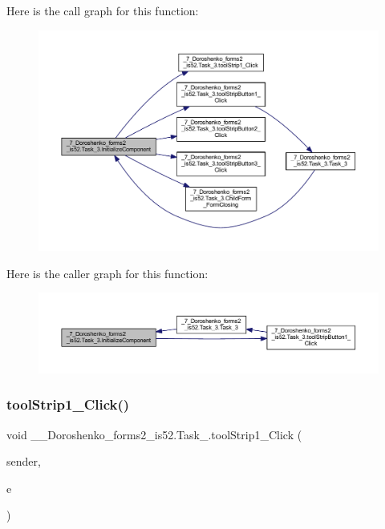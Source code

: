 Here is the call graph for this function\+:
\nopagebreak
\begin{figure}[H]
\begin{center}
\leavevmode
\includegraphics[width=350pt]{class__7___doroshenko__forms2__is52_1_1_task__3_aa9d7c9bafe9f8493f86e81275d91f706_cgraph}
\end{center}
\end{figure}
Here is the caller graph for this function\+:
\nopagebreak
\begin{figure}[H]
\begin{center}
\leavevmode
\includegraphics[width=350pt]{class__7___doroshenko__forms2__is52_1_1_task__3_aa9d7c9bafe9f8493f86e81275d91f706_icgraph}
\end{center}
\end{figure}
\hypertarget{class__7___doroshenko__forms2__is52_1_1_task__3_a2dd10c4b2313efa2c028a589b73db176}{}\label{class__7___doroshenko__forms2__is52_1_1_task__3_a2dd10c4b2313efa2c028a589b73db176} 
\subsubsection{\texorpdfstring{tool\+Strip1\+\_\+\+Click()}{toolStrip1\_Click()}}
{\footnotesize\ttfamily void \+\_\+\_\+\+Doroshenko\+\_\+forms2\+\_\+is52.\+Task\+\_.\+tool\+Strip1\+\_\+\+Click (\begin{DoxyParamCaption}\item[{object}]{sender,  }\item[{Event\+Args}]{e }\end{DoxyParamCaption})\hspace{0.3cm}{\ttfamily [private]}}

